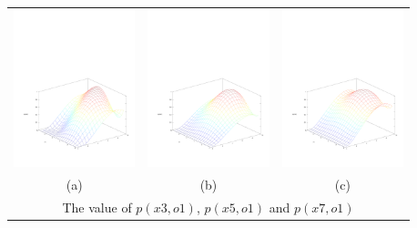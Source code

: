 \documentclass[10pt,a4paper]{article}
\begin{document}
{\centering
\begin{tabular}{ccc}
\includegraphics[width=100pt]{tracker_3d_x3o1.pdf} & \includegraphics[width=100pt]{tracker_3d_x5o1.pdf} & \includegraphics[width=100pt]{tracker_3d_x7o1.pdf} \\
(a) & (b) & (c) \\
\multicolumn{3}{c}{The value of $p(x3,o1)$, $p(x5,o1)$ and $p(x7,o1)$}
\end{tabular}
}




\end{document}

